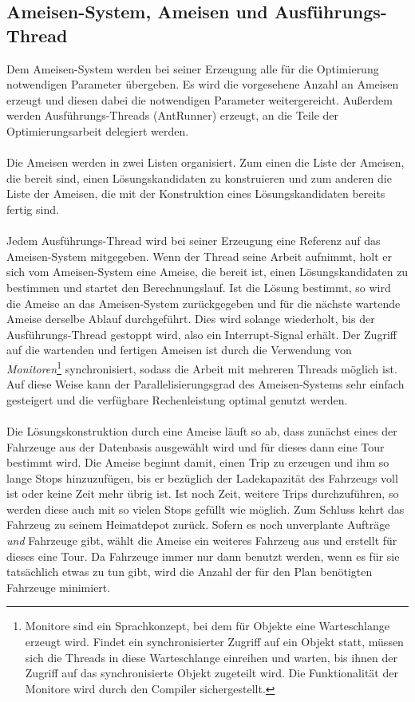\subsection{Ameisen-System, Ameisen und Ausführungs-Thread}
Dem Ameisen-System werden bei seiner Erzeugung alle für die Optimierung notwendigen Parameter übergeben. Es wird die vorgesehene Anzahl an Ameisen erzeugt und diesen dabei die notwendigen Parameter weitergereicht. Außerdem werden Ausführungs-Threads (\textsf{AntRunner}) erzeugt, an die Teile der Optimierungsarbeit delegiert werden. \\
\\
Die Ameisen werden in zwei Listen organisiert. Zum einen die Liste der Ameisen, die bereit sind, einen Lösungskandidaten zu konstruieren und zum anderen die Liste der Ameisen, die mit der Konstruktion eines Lösungskandidaten bereits fertig sind. \\
\\
Jedem Ausführungs-Thread wird bei seiner Erzeugung eine Referenz auf das Ameisen-System mitgegeben. Wenn der Thread seine Arbeit aufnimmt, holt er sich vom Amei\-sen-System eine Ameise, die bereit ist, einen Lösungskandidaten zu bestimmen und startet den Berechnungslauf. Ist die Lösung bestimmt, so wird die Ameise an das Ameisen-System zurückgegeben und für die nächste wartende Ameise derselbe Ablauf durchgeführt. Dies wird solange wiederholt, bis der Ausführungs-Thread gestoppt wird, also ein Interrupt-Signal erhält. Der Zugriff auf die wartenden und fertigen Ameisen ist durch die Verwendung von \emph{Monitoren}\footnote{Monitore sind ein Sprachkonzept, bei dem für Objekte eine Warteschlange erzeugt wird. Findet ein synchronisierter Zugriff auf ein Objekt statt, müssen sich die Threads in diese Warteschlange einreihen und warten, bis ihnen der Zugriff auf das synchronisierte Objekt zugeteilt wird. Die Funktionalität der Monitore wird durch den Compiler sichergestellt.} synchronisiert, sodass die Arbeit mit mehreren Threads möglich ist. Auf diese Weise kann der Parallelisierungsgrad des Ameisen-Systems sehr einfach gesteigert und die verfügbare Rechenleistung optimal genutzt werden. \\
\\
Die Lösungskonstruktion durch eine Ameise läuft so ab, dass zunächst eines der Fahrzeuge aus der Datenbasis ausgewählt wird und für dieses dann eine Tour bestimmt wird. Die Ameise beginnt damit, einen Trip zu erzeugen und ihm so lange Stops hinzuzufügen, bis er bezüglich der Ladekapazität des Fahrzeugs voll ist oder keine Zeit mehr übrig ist. Ist noch Zeit, weitere Trips durchzuführen, so werden diese auch mit so vielen Stops gefüllt wie möglich. Zum Schluss kehrt das Fahrzeug zu seinem Heimatdepot zurück. Sofern es noch unverplante Aufträge \emph{und} Fahrzeuge gibt, wählt die Ameise ein weiteres Fahrzeug aus und erstellt für dieses eine Tour. Da Fahrzeuge immer nur dann benutzt werden, wenn es für sie tatsächlich etwas zu tun gibt, wird die Anzahl der für den Plan benötigten Fahrzeuge minimiert. \\
